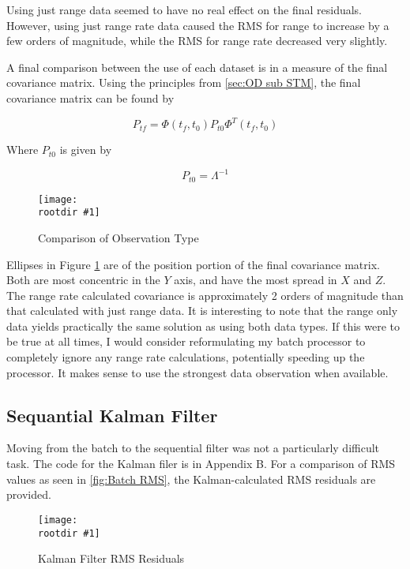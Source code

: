 \documentclass[12pt,a4paper,oneside]{article}
\numberwithin{equation}{section}   		%
\newcommand{\rootdir}{./Figures/}
\newcommand{\fig}[3]{
			\begin{figure}
				\centering
				\texttt{[image: \\rootdir \#1]}
				\caption{#2}
				\label{#3}
			\end{figure}
			}
\begin{document}
Using just range data seemed to have no real effect on the final residuals. However, using just range rate data caused the RMS for range to increase by a few orders of magnitude, while the RMS for range rate decreased very slightly. 

A final comparison between the use of each dataset is in a measure of the final covariance matrix. Using the principles from \ref{sec:OD sub STM}, the final covariance matrix can be found by

\begin{equation}
	 P_{tf} = \Phi(t_f,t_0)P_{t0} \Phi^T(t_f,t_0)
	\label{eq:Pf Batch}
\end{equation}

Where $P_{t0}$ is given by

\begin{displaymath}
	P_{t0} = \Lambda^{-1}
\end{displaymath}


\fig{PBatchObsCompare.eps}{Comparison of Observation Type}{fig:PBatch Obs Compare}


Ellipses in Figure \ref{fig:PBatch Obs Compare} are of the position portion of the final covariance matrix. Both are most concentric in the $Y$ axis, and have the most spread in $X$ and $Z$. The range rate calculated covariance is approximately 2 orders of magnitude than that calculated with just range data. It is interesting to note that the range only data yields practically the same solution as using both data types. If this were to be true at all times, I would consider reformulating my batch processor to completely ignore any range rate calculations, potentially speeding up the processor. It makes sense to use the strongest data observation when available. 




\subsection{Sequantial Kalman Filter}
\label{sec:Kalman Filter}

Moving from the batch to the sequential filter was not a particularly difficult task. The code for the Kalman filer is in Appendix B. For a comparison of RMS values as seen in \ref{fig:Batch RMS}, the Kalman-calculated RMS residuals are provided. 

\fig{KalmanRMS.eps}{Kalman Filter RMS Residuals}{fig:Kalman RMS}
\end{document}
